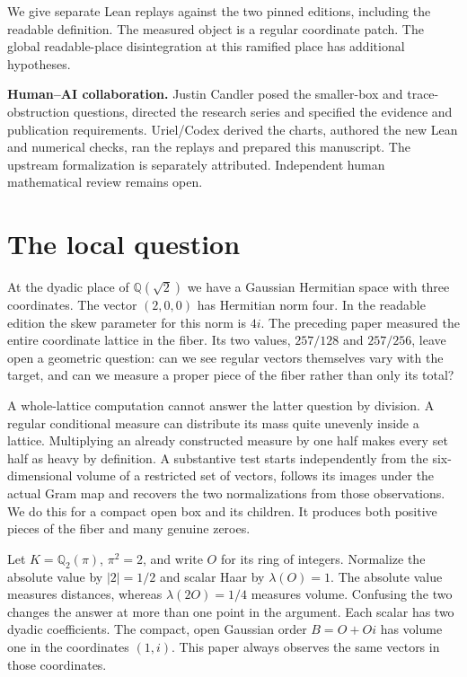 \documentclass[12pt,letterpaper]{article}
\begin{document}
We give separate Lean replays against the two pinned editions, including the readable definition. The measured object is a regular coordinate patch. The global readable-place disintegration at this ramified place has additional hypotheses.

\medskip\textbf{Human--AI collaboration.} Justin Candler posed the smaller-box and trace-obstruction questions, directed the research series and specified the evidence and publication requirements. Uriel/Codex derived the charts, authored the new Lean and numerical checks, ran the replays and prepared this manuscript. The upstream formalization is separately attributed. Independent human mathematical review remains open.
\clearpage
\begingroup\small\setlength{\parskip}{0pt}\tableofcontents\endgroup
\clearpage{}
\section{The local question}
At the dyadic place of $\mathbb Q(\sqrt2)$ we have a Gaussian Hermitian space with three coordinates. The vector $(2,0,0)$ has Hermitian norm four. In the readable edition the skew parameter for this norm is $4i$. The preceding paper measured the entire coordinate lattice in the fiber. Its two values, $257/128$ and $257/256$, leave open a geometric question: can we see regular vectors themselves vary with the target, and can we measure a proper piece of the fiber rather than only its total?

A whole-lattice computation cannot answer the latter question by division. A regular conditional measure can distribute its mass quite unevenly inside a lattice. Multiplying an already constructed measure by one half makes every set half as heavy by definition. A substantive test starts independently from the six-dimensional volume of a restricted set of vectors, follows its images under the actual Gram map and recovers the two normalizations from those observations. We do this for a compact open box and its children. It produces both positive pieces of the fiber and many genuine zeroes.

Let $K=\mathbb Q_2(\pi)$, $\pi^2=2$, and write $O$ for its ring of integers. Normalize the absolute value by $|2|=1/2$ and scalar Haar by $\lambda(O)=1$. The absolute value measures distances, whereas $\lambda(2O)=1/4$ measures volume. Confusing the two changes the answer at more than one point in the argument. Each scalar has two dyadic coefficients. The compact, open Gaussian order $B=O+Oi$ has volume one in the coordinates $(1,i)$. This paper always observes the same vectors in those coordinates.
\end{document}
